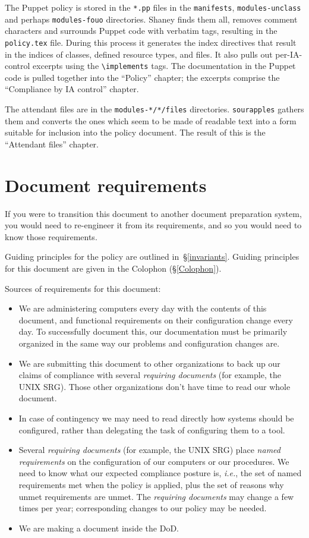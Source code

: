 The Puppet policy is stored in the \verb!*.pp! files in the
\verb!manifests!, \verb!modules-unclass! and perhaps \verb!modules-fouo!
directories. Shaney finds them all, removes comment characters and
surrounds Puppet code with verbatim tags, resulting in the {\tt
policy.tex} file. During this process it generates the index directives
that result in the indices of classes, defined resource types, and files.
It also pulls out per-IA-control excerpts using the \verb!\implements!
tags. The documentation in the Puppet code is pulled together into the
``Policy'' chapter; the excerpts comprise the ``Compliance by IA control''
chapter.

The attendant files are in the \verb!modules-*/*/files! directories.
\verb!sourapples! gathers them and converts the ones which seem to be made
of readable text into a form suitable for inclusion into the policy
document. The result of this is the ``Attendant files'' chapter.



\section{Document requirements}

If you were to transition this document to another document preparation
system, you would need to re-engineer it from its requirements, and so you
would need to know those requirements.

Guiding principles for the policy are outlined in~\S\ref{invariants}.
Guiding principles for this document are given in the Colophon
(\S\ref{Colophon}).

Sources of requirements for this document:

\begin{itemize}
\item We are administering computers every day with the contents of
  this document, and functional requirements on their configuration
  change every day. To successfully document this, our documentation
  must be primarily organized in the same way our problems and
  configuration changes are.
\item We are submitting this document to other organizations to back
  up our claims of compliance with several \emph{requiring documents}
  (for example, the UNIX SRG). Those other organizations don't have
  time to read our whole document.
\item In case of contingency we may need to read directly how systems
  should be configured, rather than delegating the task of configuring
  them to a tool.
\item Several \emph{requiring documents} (for example, the UNIX SRG)
  place \emph{named requirements} on the configuration of our
  computers or our procedures. We need to know what our expected
  compliance posture is, \emph{i.e.}, the set of named requirements
  met when the policy is applied, plus the set of reasons why unmet
  requirements are unmet. The \emph{requiring documents} may change a
  few times per year; corresponding changes to our policy may be
  needed.
\item We are making a document inside the DoD.
\end{itemize}

